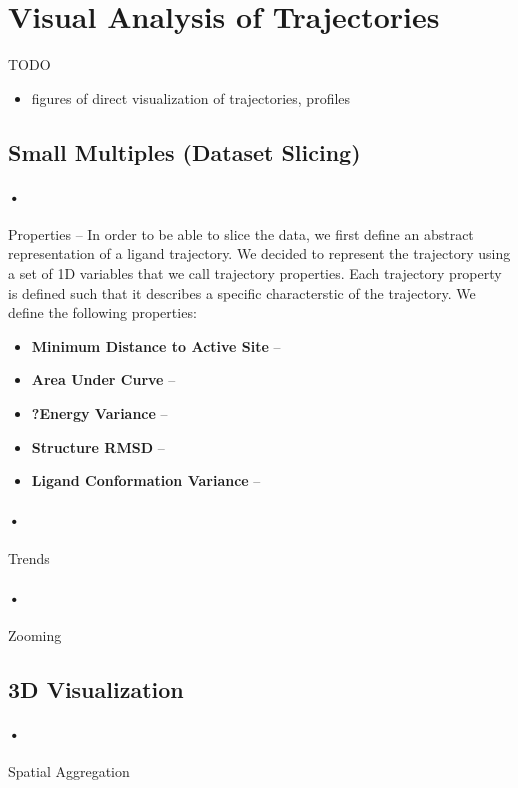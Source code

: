 \documentclass{vgtc}                          %
\begin{document}
\section{Visual Analysis of Trajectories}

TODO
\begin{itemize}
  \item figures of direct visualization of trajectories, profiles
\end{itemize}

\subsection{Small Multiples (Dataset Slicing)}
\label{sec:multiples}

\paragraph{•} Properties -- In order to be able to slice the data, we first define an abstract representation of a ligand trajectory.
We decided to represent the trajectory using a set of 1D variables that we call trajectory properties.
Each trajectory property is defined such that it describes a specific characterstic of the trajectory.
We define the following properties:
\begin{itemize}
  \item \textbf{Minimum Distance to Active Site} --
  \item \textbf{Area Under Curve} --
  \item \textbf{?Energy Variance} --
  \item \textbf{Structure RMSD} --
  \item \textbf{Ligand Conformation Variance} --
\end{itemize}

\paragraph{•} Trends

\paragraph{•} Zooming

\subsection{3D Visualization}

\paragraph{•} Spatial Aggregation
\end{document}
